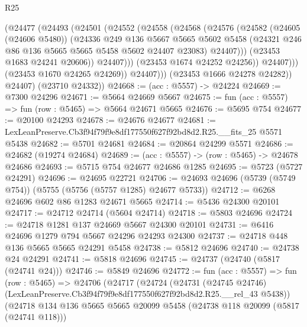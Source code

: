 \begin{lexlean}{R25}
\begin{coremodule}
                      (@24477
                        (@24493
                          (@24501
                            (@24552
                              (@24558
                                (@24568
                                  (@24576
                                    (@24582
                                      (@24605 (@24606 @5480))
                                      (@24336
                                        @249
                                        @136
                                        @5667
                                        @5665
                                        @5602
                                        @5458
                                        (@24321 @246 @86 @136 @5665 @5665 @5458 @5602 @24407 @23083)
                                        @24407)))
                                  (@23453 @1683 @24241 @20606))
                                @24407)))
                          (@23453 @1674 @24252 @24256))
                        @24407)))
                  (@23453 @1670 @24265 @24269))
                @24407)))
          (@23453 @1666 @24278 @24282))
        @24407)
      (@23710 @24332))
@24668 := (acc : @5557) -> @24224
@24669 := @7300 @24296
@24671 := @5664 @24669 @5667
@24675 := fun (acc : @5557) => fun (row : @5465) => @5664 @24671 @5665
@24676 := @5695 @754
@24677 := @20100 @24293
@24678 := @24676 @24677
@24681 := LexLeanPreserve.Cb3f94f79f9e8df177550f627f92bd8d2.R25.__fits_25 @5571 @5438
@24682 := @5701 @24681
@24684 := @20864 @24299 @5571
@24686 := @24682 (@19274 @24684)
@24689 := (acc : @5557) -> (row : @5465) -> @24678 @24686
@24693 := @5715 @754 @24677 @24686 @1285
@24695 := @5723 (@5727 @24291)
@24696 := @24695 @22721
@24706 := @24693 @24696 (@5739 (@5749 @754)) (@5755 (@5756 (@5757 @1285) @24677 @5733))
@24712 := @6268 @24696 @602 @86 @1283 @24671 @5665
@24714 := @5436 @24300 @20101
@24717 := @24712 @24714 (@5604 @24714)
@24718 := @5803 @24696
@24724 := @24718 @1281 @137 @24669 @5667 @24300 @20101
@24731 := @6416 @24696 @1279 @794 @5667 @24296 @24293 @24300
@24737 := @24718 @448 @136 @5665 @5665 @24291 @5458
@24738 := @5812 @24696
@24740 := @24738 @24 @24291
@24741 := @5818 @24696
@24745 := @24737 (@24740 (@5817 (@24741 @24)))
@24746 := @5849 @24696
@24772 := fun (acc : @5557) =>
  fun (row : @5465) =>
  @24706
    (@24717
      (@24724
        (@24731
          (@24745 @24746)
          (LexLeanPreserve.Cb3f94f79f9e8df177550f627f92bd8d2.R25.__rel_43 @5438))
        (@24718
          @134
          @136
          @5665
          @5665
          @20099
          @5458
          (@24738 @118 @20099 (@5817 (@24741 @118)))

\end{coremodule}
\end{lexlean}
